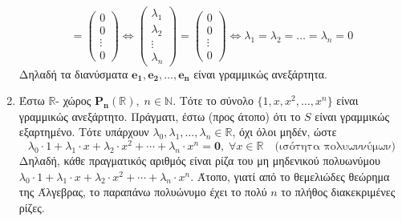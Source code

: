 \begin{examples}
\begin{enumerate}
\[              = 
              \begin{pmatrix*} 0 \\ 0 \\ \vdots \\ 0 \end{pmatrix*} 
              \Leftrightarrow 
              \begin{pmatrix*} \lambda _{1} \\ \lambda _{2} \\ \vdots \\ 
              \lambda _{n} \end{pmatrix*} = 
              \begin{pmatrix*} 0 \\ 0 \\ \vdots \\ 0 \end{pmatrix*}
              \Leftrightarrow 
              \lambda _{1} = \lambda _{2} = \dots = \lambda _{n} = 0 
            \]
            Δηλαδή τα διανύσματα $ \mathbf{e_{1}}, \mathbf{e_{2}}, \ldots, 
            \mathbf{e_{n}} $ είναι γραμμικώς ανεξάρτητα.
          \item Έστω $ \mathbb{R} $- χώρος $ \mathbf{P_{n}}(\mathbb{R}), \; n 
            \in \mathbb{N} $. Τότε το σύνολο $ \{1,x,x^{2}, \ldots,x^{n} \} $ 
            είναι γραμμικώς ανεξάρτητο. Πράγματι, έστω (προς άτοπο) ότι το 
            $S$ είναι γραμμικώς εξαρτημένο. Τότε υπάρχουν 
            $ \lambda _{0}, \lambda _{1}, \ldots, \lambda _{n} \in \mathbb{R} $, 
            όχι όλοι μηδέν, ώστε
            \[
              \lambda _{0} \cdot 1 + \lambda _{1} \cdot x + \lambda _{2} 
              \cdot x^{2} + \cdots + \lambda _{n} \cdot x^{n} = \mathbf{0}, \; 
              \forall x \in \mathbb{R} \quad \text{(ισότητα πολυωννύμων)}   
            \]
            Δηλαδή, κάθε πραγματικός αριθμός είναι ρίζα του μη μηδενικού πολυωνύμου 
            $ \lambda _{0} \cdot 1 + \lambda _{1} \cdot x + \lambda _{2} 
            \cdot x^{2} + \cdots + \lambda _{n} \cdot x^{n} $. Άτοπο, γιατί από 
            το θεμελιώδες θεώρημα της Άλγεβρας, το παραπάνω πολυώνυμο έχει το 
            πολύ $ n $ το πλήθος διακεκριμένες ρίζες.
    \end{enumerate}
\end{examples}

